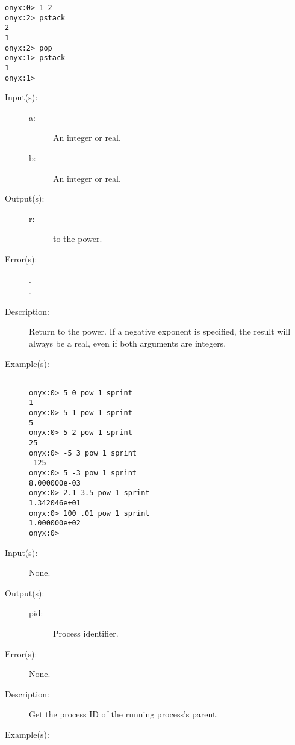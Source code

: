 \begin{description}
\begin{description}
\begin{verbatim}
onyx:0> 1 2
onyx:2> pstack
2
1
onyx:2> pop
onyx:1> pstack
1
onyx:1>
		\end{verbatim}
	\end{description}
\label{systemdict:pow}
\item[{\onyxop{a b}{pow}{r}}: ]
	\begin{description}\item[]
	\item[Input(s): ]
		\begin{description}\item[]
		\item[a: ]
			An integer or real.
		\item[b: ]
			An integer or real.
		\end{description}
	\item[Output(s): ]
		\begin{description}\item[]
		\item[r: ]
			 to the  power.
		\end{description}
	\item[Error(s): ]
		\begin{description}\item[]
		\item[.]
		\item[.]
		\end{description}
	\item[Description: ]
		Return  to the  power.  If a negative exponent
		is specified, the result will always be a real, even if both
		arguments are integers.
	\item[Example(s): ]\begin{verbatim}

onyx:0> 5 0 pow 1 sprint
1
onyx:0> 5 1 pow 1 sprint
5
onyx:0> 5 2 pow 1 sprint
25
onyx:0> -5 3 pow 1 sprint
-125
onyx:0> 5 -3 pow 1 sprint
8.000000e-03
onyx:0> 2.1 3.5 pow 1 sprint
1.342046e+01
onyx:0> 100 .01 pow 1 sprint
1.000000e+02
onyx:0>
		\end{verbatim}
	\end{description}
\label{systemdict:ppid}
\item[{\onyxop{--}{ppid}{pid}}: ]
	\begin{description}\item[]
	\item[Input(s): ] None.
	\item[Output(s): ]
		\begin{description}\item[]
		\item[pid: ]
			Process identifier.
		\end{description}
	\item[Error(s): ] None.
	\item[Description: ]
		Get the process ID of the running process's parent.
	\item[Example(s): ]\begin{verbatim}


\end{verbatim}
\end{description}
\end{description}
